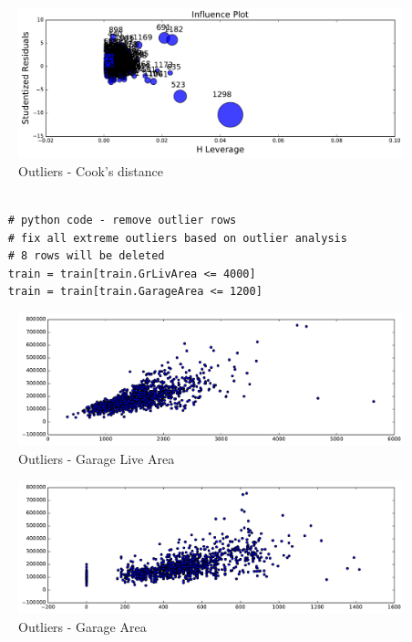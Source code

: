 \documentclass[sigconf]{acmart}
\begin{document}
	\begin{figure}[H]
		\centering
		\includegraphics[width=.95\columnwidth]{images/outliers}	
		\caption{Outliers - Cook's distance} \label{fig:outliers} 
	\end{figure}
	
	\begin{verbatim}
	
	# python code - remove outlier rows
	# fix all extreme outliers based on outlier analysis
	# 8 rows will be deleted
	train = train[train.GrLivArea <= 4000]
	train = train[train.GarageArea <= 1200]
	\end{verbatim}
	
	\begin{figure}[H]
		\centering
		\includegraphics[width=.95\columnwidth]{images/gr_liv_area_outlier}	
		\caption{Outliers - Garage Live Area} \label{fig:gr_liv_area_outlier} 
	\end{figure}
	
	\begin{figure}[H]
		\centering
		\includegraphics[width=.95\columnwidth]{images/garage_area_outlier}	
		\caption{Outliers - Garage Area} \label{fig:garage_area_outlier} 
	\end{figure}
	
\end{document}
